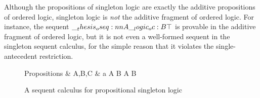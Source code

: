 Although the propositions of singleton logic are exactly the additive propositions of ordered logic, singleton logic is \emph{not} the additive fragment of ordered logic.
For instance, the sequent $\oseq{A \oc B |- \top}$ is provable in the additive fragment of ordered logic, but it
is not even a well-formed sequent in the singleton sequent calculus, for the simple reason that it violates the single-antecedent restriction.
%
\begin{figure}[tbp]
  \vspace*{\dimexpr-\abovedisplayskip-\abovecaptionskip\relax}
  \begin{syntax*}
    Propositions &
      A,B,C & a \mid A \plus B \mid \zero \mid A \with B \mid \top
  \end{syntax*}
  \vspace*{-\belowdisplayskip}
  \caption{A sequent calculus for propositional singleton logic\label{fig:singleton-logic:seq-calc}}
  \forcerectofloat
\end{figure}

